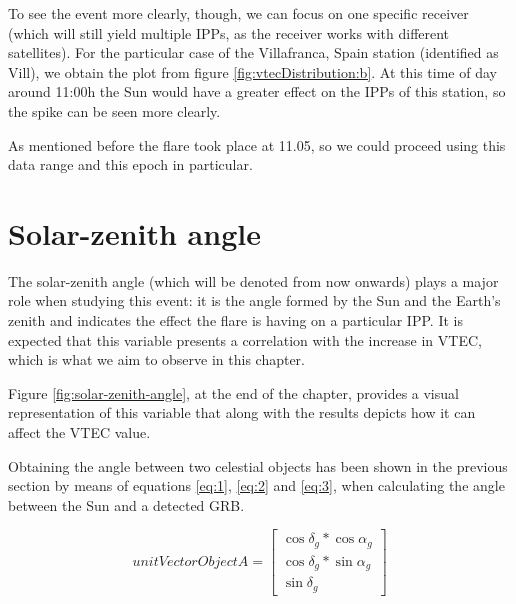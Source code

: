 To see the event more clearly, though, we can focus on one specific receiver (which will still yield multiple IPPs, as the receiver works with different satellites). For the particular case of the Villafranca, Spain station (identified as Vill), we obtain the plot from figure \ref{fig:vtecDistribution:b}. At this time of day around 11:00h the Sun would have a greater effect on the IPPs of this station, so the spike can be seen more clearly. 

As mentioned before the flare took place at 11.05, so we could proceed using this data range and this epoch in particular.

\section{Solar-zenith angle}

The solar-zenith angle (which will be denoted \chi from now onwards) plays a major role when studying this event: it is the angle formed by the Sun and the Earth's zenith and indicates the effect the flare is having on a particular IPP. It is expected that this variable presents a correlation with the increase in VTEC, which is what we aim to observe in this chapter.

Figure \ref{fig:solar-zenith-angle}, at the end of the chapter, provides a visual representation of this variable that along with the results depicts how it can affect the VTEC value. 

Obtaining the angle between two celestial objects has been shown in the previous section by means of equations \ref{eq:1}, \ref{eq:2} and \ref{eq:3}, when calculating the angle between the Sun and a detected GRB.

\begin{equation} \label{eq:1}
unitVectorObjectA =	
\begin{bmatrix}
\cos\delta_{g} * \cos\alpha_{g} \\ 
\cos\delta_{g} * \sin\alpha_{g} \\
\sin\delta_{g}
\end{bmatrix}
\end{equation}

